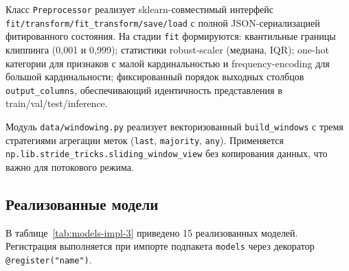 Класс \texttt{Preprocessor} реализует sklearn-совместимый интерфейс
\texttt{fit/transform/fit\_transform/save/load} с полной JSON-сериализацией
фитированного состояния. На стадии \texttt{fit} формируются:
квантильные границы клиппинга (0,001 и 0,999);
статистики robust-scaler (медиана, IQR);
one-hot категории для признаков с малой кардинальностью и
frequency-encoding для большой кардинальности;
фиксированный порядок выходных столбцов \texttt{output\_columns},
обеспечивающий идентичность представления в train/val/test/inference.

Модуль \texttt{data/windowing.py} реализует векторизованный
\texttt{build\_windows} с тремя стратегиями агрегации меток
(\texttt{last}, \texttt{majority}, \texttt{any}). Применяется
\texttt{np.lib.stride\_tricks.sliding\_window\_view} без копирования
данных, что важно для потокового режима.

\subsection{Реализованные модели}

В таблице~\ref{tab:models-impl-3} приведено 15 реализованных
моделей. Регистрация выполняется при импорте подпакета
\texttt{models} через декоратор \texttt{@register("name")}.


